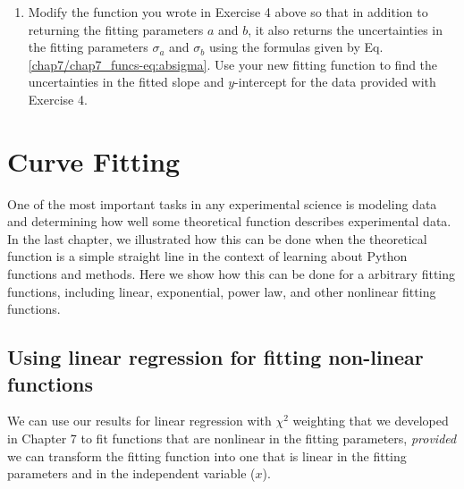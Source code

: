 \documentclass[letterpaper,10pt,english]{sphinxmanual}
\begin{document}
\begin{enumerate}
\begin{enumerate}
\end{enumerate}

\item {} 
Modify the function  you wrote in Exercise 4 above so that in addition to returning the fitting parameters $a$ and $b$, it also returns the uncertainties in the fitting parameters $\sigma_a$ and $\sigma_b$ using the formulas given by Eq. \eqref{chap7/chap7_funcs-eq:absigma}.  Use your new fitting function to find the uncertainties in the fitted slope and $y$-intercept for the data provided with Exercise 4.

\end{enumerate}


\chapter{Curve Fitting}
\label{chap8/chap8_fitting:index-0}\label{chap8/chap8_fitting::doc}\label{chap8/chap8_fitting:curve-fitting}\label{chap8/chap8_fitting:chap8}
One of the most important tasks in any experimental science is modeling data and determining how well some theoretical function describes experimental data.  In the last chapter, we illustrated how this can be done when the theoretical function is a simple straight line in the context of learning about Python functions and methods.  Here we show how this can be done for a arbitrary fitting functions, including linear, exponential, power law, and other nonlinear fitting functions.


\section{Using linear regression for fitting non-linear functions}
\label{chap8/chap8_fitting:using-linear-regression-for-fitting-non-linear-functions}
We can use our results for linear regression with $\chi^2$ weighting that we developed in Chapter 7 to fit functions that are nonlinear in the fitting parameters, \emph{provided} we can transform the fitting function into one that is linear in the fitting parameters and in the independent variable ($x$).

\end{document}
